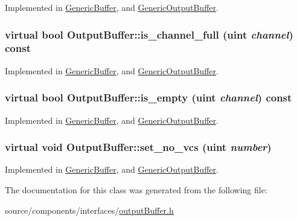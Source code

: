 Implemented in \hyperlink{classGenericBuffer_3b5ed41f7cee8ba1fa059aaa0b9db55a}{GenericBuffer}, and \hyperlink{classGenericOutputBuffer_d7f10031a96719bc97a11d3a96f4ef6f}{GenericOutputBuffer}.\hypertarget{classOutputBuffer_23aaeb2aa62e944596d50a569ed5d859}{
\subsubsection[{is\_\-channel\_\-full}]{\setlength{\rightskip}{0pt plus 5cm}virtual bool OutputBuffer::is\_\-channel\_\-full ({\bf uint} {\em channel}) const}}
\label{classOutputBuffer_23aaeb2aa62e944596d50a569ed5d859}




Implemented in \hyperlink{classGenericBuffer_91aa6e2af039aa6c1a50a599fc3f3203}{GenericBuffer}, and \hyperlink{classGenericOutputBuffer_cc3ce27817dea583b8c0cb269b3c9cdb}{GenericOutputBuffer}.\hypertarget{classOutputBuffer_7cba09e2dbb3794d873862b5066fd085}{
\subsubsection[{is\_\-empty}]{\setlength{\rightskip}{0pt plus 5cm}virtual bool OutputBuffer::is\_\-empty ({\bf uint} {\em channel}) const}}
\label{classOutputBuffer_7cba09e2dbb3794d873862b5066fd085}




Implemented in \hyperlink{classGenericBuffer_94742936925e0b4873dd270aed2c326d}{GenericBuffer}, and \hyperlink{classGenericOutputBuffer_df867815a21d8e832ba19aa63fa65e55}{GenericOutputBuffer}.\hypertarget{classOutputBuffer_5fafb6827567941d238ae16991c5c1a8}{
\subsubsection[{set\_\-no\_\-vcs}]{\setlength{\rightskip}{0pt plus 5cm}virtual void OutputBuffer::set\_\-no\_\-vcs ({\bf uint} {\em number})}}
\label{classOutputBuffer_5fafb6827567941d238ae16991c5c1a8}




Implemented in \hyperlink{classGenericBuffer_d955be71ad7a5f0bb408dccfb9fd45d3}{GenericBuffer}, and \hyperlink{classGenericOutputBuffer_a0dcb541c9d64d097a21dd8b290c3950}{GenericOutputBuffer}.

The documentation for this class was generated from the following file:\begin{CompactItemize}
\item 
source/components/interfaces/\hyperlink{outputBuffer_8h}{outputBuffer.h}\end{CompactItemize}
